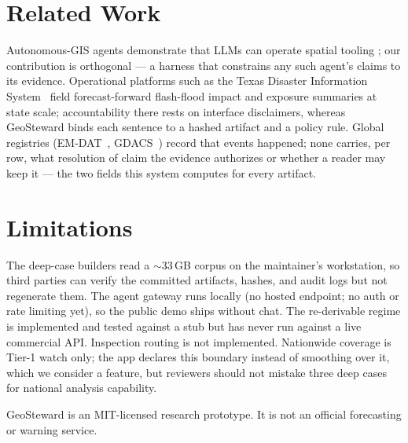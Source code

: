 \documentclass[sigconf,screen]{acmart}
\begin{document}
\section{Related Work}

Autonomous-GIS agents demonstrate that LLMs can operate spatial tooling
\cite{li2023autonomous,zhang2024geogpt}; our contribution is orthogonal
--- a harness that constrains any such agent's claims to its evidence.
Operational platforms such as the Texas Disaster Information
System~\cite{tdis2026} field forecast-forward flash-flood impact and exposure summaries at
state scale; accountability there rests on interface disclaimers,
whereas GeoSteward binds each sentence to a hashed artifact and a policy
rule. Global registries (EM-DAT~\cite{delforge2025emdat}, GDACS~\cite{gdacs}) record that events happened;
none carries, per row, what resolution of claim the evidence authorizes
or whether a reader may keep it --- the two fields this system computes
for every artifact.

\section{Limitations}

The deep-case builders read a $\sim$33\,GB corpus on the maintainer's
workstation, so third parties can verify the committed artifacts,
hashes, and audit logs but not regenerate them. The agent gateway runs
locally (no hosted endpoint; no auth or rate limiting yet), so the
public demo ships without chat. The re-derivable regime is implemented
and tested against a stub but has never run against a live commercial
API. Inspection routing is not implemented. Nationwide coverage is
Tier-1 watch only; the app declares this boundary instead of smoothing
over it, which we consider a feature, but reviewers should not mistake
three deep cases for national analysis capability.

\begin{acks}
GeoSteward is an MIT-licensed research prototype. It is not an official
forecasting or warning service.
\end{acks}



\end{document}
